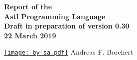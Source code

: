\begin{titlepage}
   \begin{flushright}
      {\Huge \bfseries
	 Report of the \\
	 Astl Programming Language \\
	 Draft in preparation of version 0.30 \\
	 22 March 2019 \\
      }

      \vspace*{\fill}

      \href{https://creativecommons.org/licenses/by-sa/4.0/}
      {\texttt{[image: by-sa.pdf]}}
      \hspace*{\fill}
      {\huge
	 Andreas F. Borchert \\
      }
   \end{flushright}
\end{titlepage}
